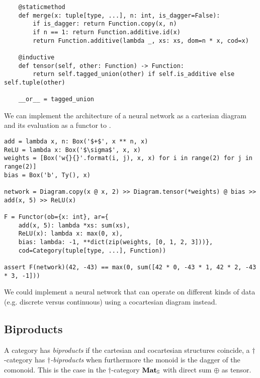 \begin{python}
\begin{verbatim}
    @staticmethod
    def merge(x: tuple[type, ...], n: int, is_dagger=False):
        if is_dagger: return Function.copy(x, n)
        if n == 1: return Function.additive.id(x)
        return Function.additive(lambda _, xs: xs, dom=n * x, cod=x)

    @inductive
    def tensor(self, other: Function) -> Function:
        return self.tagged_union(other) if self.is_additive else self.tuple(other)

    __or__ = tagged_union
\end{verbatim}
\end{python}

\begin{example}
We can implement the architecture of a neural network as a cartesian diagram and its evaluation as a functor to .

\begin{verbatim}
add = lambda x, n: Box('$+$', x ** n, x)
ReLU = lambda x: Box('$\sigma$', x, x)
weights = [Box('w{}{}'.format(i, j), x, x) for i in range(2) for j in range(2)]
bias = Box('b', Ty(), x)

network = Diagram.copy(x @ x, 2) >> Diagram.tensor(*weights) @ bias >> add(x, 5) >> ReLU(x)

F = Functor(ob={x: int}, ar={
    add(x, 5): lambda *xs: sum(xs),
    ReLU(x): lambda x: max(0, x),
    bias: lambda: -1, **dict(zip(weights, [0, 1, 2, 3]))},
    cod=Category(tuple[type, ...], Function))

assert F(network)(42, -43) == max(0, sum([42 * 0, -43 * 1, 42 * 2, -43 * 3, -1]))
\end{verbatim}

We could implement a neural network that can operate on different kinds of data (e.g. discrete versus continuous) using a cocartesian diagram instead.
\end{example}

\subsection{Biproducts}\label{subsection:biproducts}

A category has \emph{biproducts} if the cartesian and cocartesian structures coincide,
a $\dagger$-category has \emph{$\dagger$-biproducts} when furthermore the monoid is the dagger of the comonoid.
This is the case in the $\dagger$-category $\mathbf{Mat}_\S$ with direct sum $\oplus$ as tensor.

